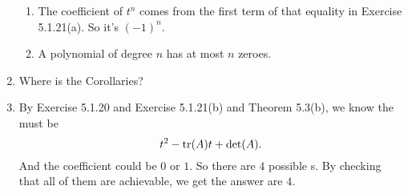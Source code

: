 \begin{enumerate}
\begin{enumerate}
\item The coefficient of $t^n$ comes from the first term of that equality in Exercise 5.1.21(a). So it's $(-1)^n$.
\item A polynomial of degree $n$ has at most $n$ zeroes.
\end{enumerate}
\item Where is the Corollaries?
\item By Exercise 5.1.20 and Exercise 5.1.21(b) and Theorem 5.3(b), we know the \charpoly{} must be 
\[t^2-\operatorname{tr}(A)t+\det(A).\]
And the coefficient could be $0$ or $1$. So there are $4$ possible \charpoly s. By checking that all of them are achievable, we get the answer are $4$.
\end{enumerate}
